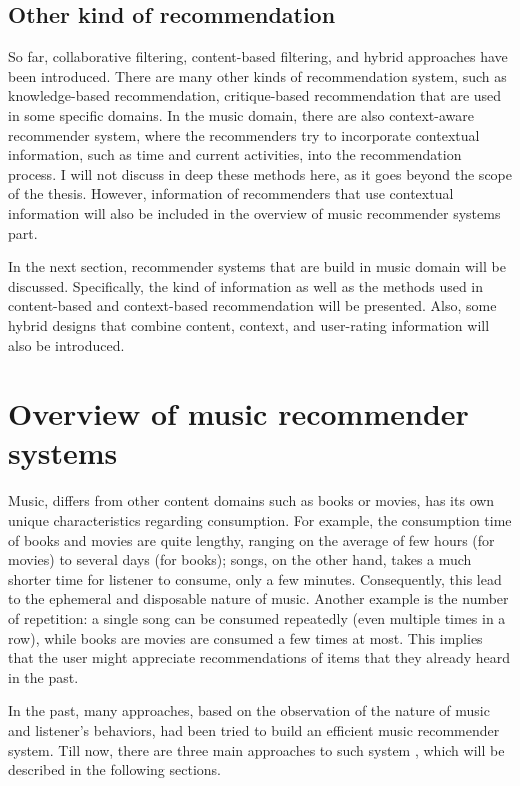 \subsection{Other kind of recommendation}
So far, collaborative filtering, content-based filtering, and hybrid approaches have been introduced. There are many other kinds of recommendation system, such as knowledge-based recommendation, critique-based recommendation that are used in some specific domains. In the music domain, there are also context-aware recommender system, where the recommenders try to incorporate contextual information, such as time and current activities, into the recommendation process. I will not discuss in deep these methods here, as it goes beyond the scope of the thesis. However, information of recommenders that use contextual information will also be included in the overview of music recommender systems part.

In the next section, recommender systems that are build in music domain will be discussed. Specifically, the kind of information as well as the methods used in content-based and context-based recommendation will be presented. Also, some hybrid designs that combine content, context, and user-rating information will also be introduced. 

\section{Overview of music recommender systems}
Music, differs from other content domains such as books or movies, has its own unique characteristics regarding consumption. For example, the consumption time of books and movies are quite lengthy, ranging on the average of few hours (for movies) to several days (for books); songs, on the other hand, takes a much shorter time for listener to consume, only a few minutes. Consequently, this lead to the ephemeral and disposable nature of music. Another example is the number of repetition: a single song can be consumed repeatedly (even multiple times in a row), while books are movies are consumed a few times at most. This implies that the user might appreciate recommendations of items that they already heard in the past.

In the past, many approaches, based on the observation of the nature of music and listener's behaviors, had been tried to build an efficient music recommender system. Till now, there are three main approaches to such system \cite{ricci2011introduction}, which will be described in the following sections. 

